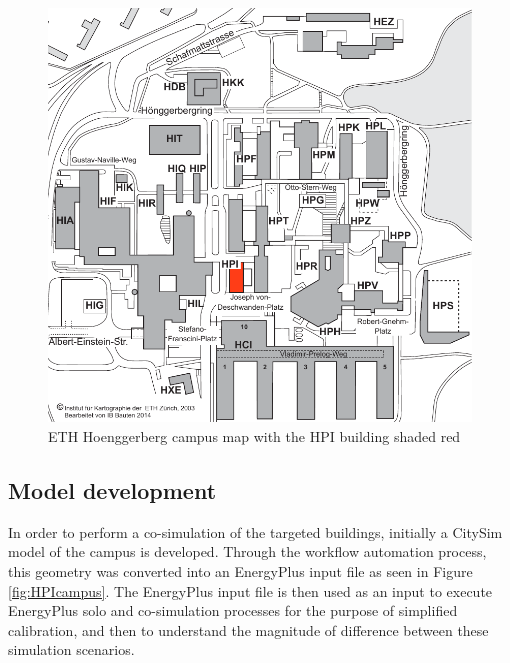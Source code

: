 \documentclass{tBPS2e}
\theoremstyle{plain}
\theoremstyle{definition}
\theoremstyle{remark}
\begin{document}
\begin{figure}[H]
\centering
\includegraphics[scale=0.5]{figures/ETH_Hoenngerbergcamp_targetedbuildings_HPI}
\caption{ETH Hoenggerberg campus map with the HPI building shaded red}
\label{fig:campusmap}
\end{figure}

\subsection{Model development}
In order to perform a co-simulation of the targeted buildings, initially a CitySim model of the campus is developed. Through the workflow automation process, this geometry was converted into an EnergyPlus input file as seen in Figure \ref{fig:HPIcampus}. The EnergyPlus input file is then used as an input to execute EnergyPlus solo and co-simulation processes for the purpose of simplified calibration, and then to understand the magnitude of difference between these simulation scenarios.
\end{document}
